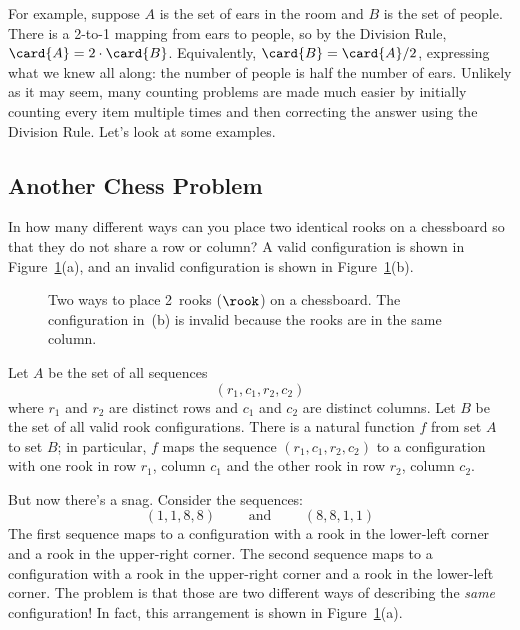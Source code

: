 For example, suppose $A$ is the set of ears in the room and $B$ is the set
of people.  There is a 2-to-1 mapping from ears to people, so by the
Division Rule, $\card{A} = 2 \cdot \card{B}$.  Equivalently, $\card{B} =
\card{A} / 2$, expressing what we knew all along: the number of people is
half the number of ears.  Unlikely as it may seem, many counting problems
are made much easier by initially counting every item multiple times and
then correcting the answer using the Division Rule.  Let's look at some
examples.

\subsection{Another Chess Problem}

In how many different ways can you place two identical rooks on a
chessboard so that they do not share a row or column?  A valid
configuration is shown in Figure~\ref{fig:11Q8}(a), and an invalid
configuration is shown in Figure~\ref{fig:11Q8}(b).

\begin{figure}\normalbaselines

\subfloat[valid]{\chessboard[setpieces={ra1, rh8}]}
\subfloat[invalid]{\chessboard[setpieces={rd1, rd6}]}

\caption{Two ways to place 2~rooks ($\rook$) on a chessboard.  The
  configuration in~(b) is invalid because the rooks are in the same
  column.}

\label{fig:11Q8}

\end{figure}

Let $A$ be the set of all sequences
%
\[
(r_1, c_1, r_2, c_2)
\]
%
where $r_1$ and $r_2$ are distinct rows and $c_1$ and $c_2$ are
distinct columns.  Let $B$ be the set of all valid rook
configurations.  There is a natural function $f$ from set $A$ to set
$B$; in particular, $f$ maps the sequence $(r_1, c_1, r_2, c_2)$ to a
configuration with one rook in row $r_1$, column $c_1$ and the other
rook in row $r_2$, column $c_2$.

But now there's a snag.  Consider the sequences:
%
\[
(1, 1, 8, 8) \qquad \text{ and } \qquad (8, 8, 1, 1)
\]
%
The first sequence maps to a configuration with a rook in the
lower-left corner and a rook in the upper-right corner.  The second
sequence maps to a configuration with a rook in the upper-right corner
and a rook in the lower-left corner.  The problem is that those are
two different ways of describing the \emph{same} configuration!  In
fact, this arrangement is shown in Figure~\ref{fig:11Q8}(a).

